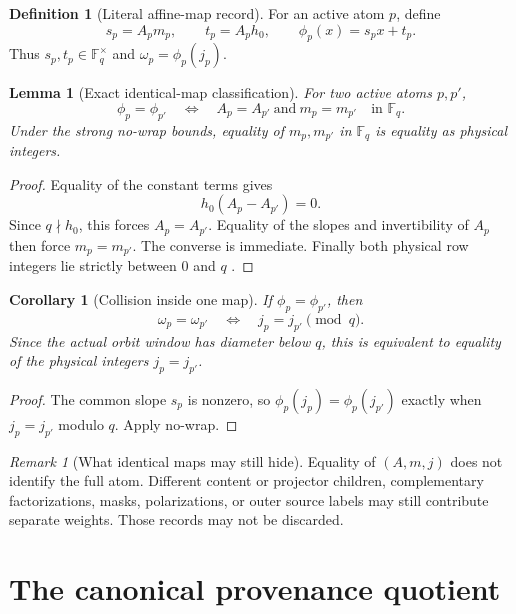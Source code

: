 \documentclass[11pt]{article}
\newtheorem{corollary}[theorem]{Corollary}
\newtheorem{lemma}[theorem]{Lemma}
\theoremstyle{definition}
\newtheorem{definition}[theorem]{Definition}
\theoremstyle{remark}
\newtheorem{remark}[theorem]{Remark}
\newcommand{\F}{\mathbb F}
\begin{document}
\begin{definition}[Literal affine-map record]
\label{def:map}
For an active atom \(p\), define
\[
 s_p=A_pm_p,\qquad t_p=A_ph_0,\qquad
 \phi_p(x)=s_px+t_p.
\]
Thus \(s_p,t_p\in\F_q^\times\) and
\(\omega_p=\phi_p(j_p)\).
\end{definition}

\begin{lemma}[Exact identical-map classification]
\label{lem:classification}
For two active atoms \(p,p'\),
\[
 \phi_p=\phi_{p'}
 \quad\Longleftrightarrow\quad
 A_p=A_{p'}\ \text{and}\ m_p=m_{p'}
 \quad\text{in }\F_q.
\]
Under the strong no-wrap bounds, equality of \(m_p,m_{p'}\) in
\(\F_q\) is equality as physical integers.
\end{lemma}

\begin{proof}
Equality of the constant terms gives
\[
 h_0(A_p-A_{p'})=0.
\]
Since \(q\nmid h_0\), this forces \(A_p=A_{p'}\).  Equality of the
slopes and invertibility of \(A_p\) then force
\(m_p=m_{p'}\).  The converse is immediate.  Finally both physical
row integers lie strictly between \(0\) and \(q\)
\citep{WangTPC98}.
\end{proof}

\begin{corollary}[Collision inside one map]
\label{cor:same-map-collision}
If \(\phi_p=\phi_{p'}\), then
\[
 \omega_p=\omega_{p'}
 \quad\Longleftrightarrow\quad
 j_p=j_{p'}\pmod q.
\]
Since the actual orbit window has diameter below \(q\), this is
equivalent to equality of the physical integers \(j_p=j_{p'}\).
\end{corollary}

\begin{proof}
The common slope \(s_p\) is nonzero, so
\(\phi_p(j_p)=\phi_p(j_{p'})\) exactly when
\(j_p=j_{p'}\) modulo \(q\).  Apply no-wrap.
\end{proof}

\begin{remark}[What identical maps may still hide]
Equality of \((A,m,j)\) does not identify the full atom.  Different
content or projector children, complementary factorizations, masks,
polarizations, or outer source labels may still contribute separate
weights.  Those records may not be discarded.
\end{remark}

\section{The canonical provenance quotient}
\label{sec:quotient}
\end{document}
